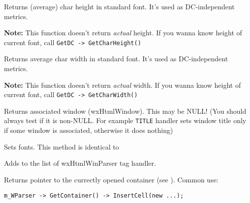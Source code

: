 
Returns (average) char height in standard font. It's used as DC-independent metrics.

{\bf Note:} This function doesn't return {\it actual} height. If you wanna
know height of current font, call {\tt GetDC -> GetCharHeight()}

\label{wxhtmlwinparsergetcharwidth}


Returns average char width in standard font. It's used as DC-independent metrics.

{\bf Note:} This function doesn't return {\it actual} width. If you wanna
know height of current font, call {\tt GetDC -> GetCharWidth()}

\label{wxhtmlwinparsergetwindow}


Returns associated window (wxHtmlWindow). This may be NULL! (You should always
test if it is non-NULL. For example {\tt TITLE} handler sets window
title only if some window is associated, otherwise it does nothing)


\label{wxhtmlwinparsersetfonts}


Sets fonts. This method is identical to 


\label{wxhtmlwinparseraddmodule}


Adds  to the list of wxHtmlWinParser tag handler.


\label{wxhtmlwinparsergetcontainer}


Returns pointer to the currectly opened container (see ).
Common use:

\begin{verbatim}
m_WParser -> GetContainer() -> InsertCell(new ...);
\end{verbatim}

